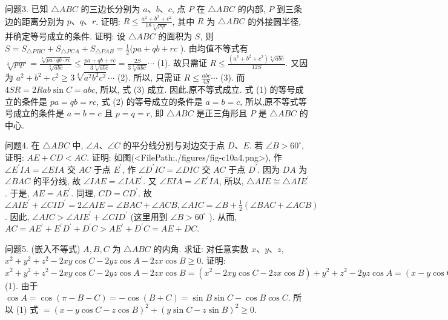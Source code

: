 问题3. 已知 $\triangle A B C$ 的三边长分别为 $a 、 b 、 c$, 点 $P$ 在 $\triangle A B C$ 的内部, $P$ 到三条边的距离分别为 $p 、 q 、 r$. 证明: $R \leqslant \frac{a^2+b^2+c^2}{18 \sqrt[3]{p q r}}$, 其中 $R$ 为 $\triangle A B C$ 的外接圆半径, 并确定等号成立的条件.
证明: 设 $\triangle A B C$ 的面积为 $S$, 则 $S=S_{\triangle P B C}+S_{\triangle P C A}+S_{\triangle P A B}=\frac{1}{2}(p a+q b+r c$ ). 由均值不等式有 $\sqrt[3]{p q r}=\frac{\sqrt[3]{p a \cdot q b \cdot r c}}{\sqrt[3]{a b c}} \leqslant \frac{p a+q b+r c}{3 \sqrt[3]{a b c}}= \frac{2 S}{3 \sqrt[3]{a b c}} \cdots$ (1). 故只需证 $R \leqslant \frac{\left(a^2+b^2+c^2\right) \sqrt[3]{a b c}}{12 S}$. 又因为 $a^2+b^2+c^2 \geqslant 3 \sqrt[3]{a^2 b^2 c^2} \cdots$ (2). 所以, 只需证 $R \leqslant \frac{a b c}{4 S} \cdots$ (3). 而 $4 S R=2 R a b \sin C=a b c$, 所以, 式 (3) 成立.
因此,原不等式成立.
式 (1) 的等号成立的条件是 $p a=q b=r c$, 式 (2) 的等号成立的条件是 $a= b=c$, 所以,原不等式等号成立的条件是 $a=b=c$ 且 $p=q=r$, 即 $\triangle A B C$ 是正三角形且 $P$ 是 $\triangle A B C$ 的中心.



问题4. 在 $\triangle A B C$ 中, $\angle A 、 \angle C$ 的平分线分别与对边交于点 $D 、 E$. 若 $\angle B> 60^{\circ}$, 证明: $A E+C D<A C$.
证明: 如图(<FilePath:./figures/fig-c10a4.png>), 作 $\angle E^{\prime} I A=\angle E I A$ 交 $A C$ 于点 $E^{\prime}$, 作 $\angle D^{\prime} I C=\angle D I C$ 交 $A C$ 于点 $D^{\prime}$. 因为 $D A$ 为 $\angle B A C$ 的平分线, 故 $\angle I A E=\angle I A E^{\prime}$. 又 $\angle E I A=\angle E^{\prime} I A$, 所以, $\triangle A I E \cong \triangle A I E^{\prime}$. 于是, $A E=A E^{\prime}$. 同理, $C D=C D^{\prime}$. 故 $\angle A I E^{\prime}+\angle C I D^{\prime}=2 \angle A I E=\angle B A C+\angle A C B, \angle A I C=\angle B+ \frac{1}{2}(\angle B A C+\angle A C B)$. 因此, $\angle A I C>\angle A I E^{\prime}+\angle C I D^{\prime}$ (这里用到 $\angle B> 60^{\circ}$ ). 从而, $A C=A E^{\prime}+E^{\prime} D^{\prime}+D^{\prime} C>A E^{\prime}+D^{\prime} C=A E+D C$.



问题5. (嵌入不等式) $A, B, C$ 为 $\triangle A B C$ 的内角.
求证: 对任意实数 $x 、 y 、 z$, $x^2+y^2+z^2-2 x y \cos C-2 y z \cos A-2 z x \cos B \geqslant 0$.
证明: $x^2+y^2+z^2-2 x y \cos C-2 y z \cos A-2 z x \cos B=(x^2-2 x y \cos C-2 z x \cos B)+y^2+z^2-2 y z \cos A=(x-y \cos C-z \cos B)^2+y^2 \sin ^2 C+ z^2 \sin ^2 B-2 y z \cdot \cos A-2 y z \cos B \cos C \cdots$ (1).
由于 $\cos A=\cos (\pi-B-C)=-\cos (B+C)=\sin B \sin C-\cos B \cos C$. 所以 (1) 式 $=(x-y \cos C-z \cos B)^2+(y \sin C-z \sin B)^2 \geqslant 0$.



